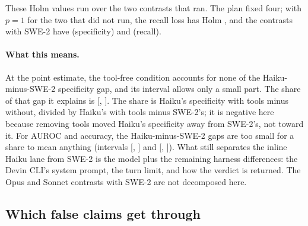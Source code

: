 \documentclass[11pt]{article}
\begin{document}
These Holm values run over the two contrasts that ran. The plan fixed four; with $p=1$ for the two that did not run, the recall loss has Holm , and the contrasts with SWE-2 have  (specificity) and  (recall).

\paragraph{What this means.} At the point estimate, the tool-free condition accounts for none of the Haiku-minus-SWE-2 specificity gap, and its interval allows only a small part. The share of that gap it explains is  [, ]. The share is Haiku's specificity with tools minus without, divided by Haiku's with tools minus SWE-2's; it is negative here because removing tools moved Haiku's specificity away from SWE-2's, not toward it. For AUROC and accuracy, the Haiku-minus-SWE-2 gaps are too small for a share to mean anything (intervals [, ] and [, ]). What still separates the inline Haiku lane from SWE-2 is the model plus the remaining harness differences: the Devin CLI's system prompt, the turn limit, and how the verdict is returned. The Opus and Sonnet contrasts with SWE-2 are not decomposed here.

\begin{table}[h]
\centering\small
\resizebox{\textwidth}{!}{}
\caption{Harness decomposition: planned paired contrasts on the 144 cases, claim-family bootstrap for AUROC and family-level sign-flips for the rest, Holm within each metric across the two contrasts that ran. The plan fixed Holm across four contrasts; with $p=1$ for the two Sonnet contrasts that did not run, Holm gives, for the two rows in order, tail AUROC  and , accuracy  and , recall  and , specificity  and .}
\label{tab:harness}
\end{table}

\subsection{Which false claims get through}
\end{document}
